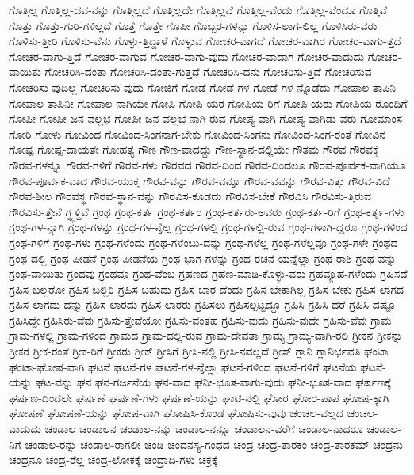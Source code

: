 {ಗೊತ್ತಿಲ್ಲ
ಗೊತ್ತಿಲ್ಲ-ದವ-ನನ್ನು
ಗೊತ್ತಿಲ್ಲದೆ
ಗೊತ್ತಿಲ್ಲದೇ
ಗೊತ್ತಿಲ್ಲವೆ
ಗೊತ್ತಿಲ್ಲ-ವೆಂದು
ಗೊತ್ತಿಲ್ಲ-ವೆಂದೂ
ಗೊತ್ತಿವೆ
ಗೊತ್ತು
ಗೊತ್ತು-ಗುರಿ-ಗಳಿಲ್ಲದೆ
ಗೊತ್ತೆ
ಗೊತ್ತೇ
ಗೊಪೀ
ಗೊಬ್ಬರ-ಗಳನ್ನು
ಗೊಳಿಸ-ಲಾಗ-ಲಿಲ್ಲ
ಗೊಳಿಸಿರು-ವರು
ಗೊಳಿಸು-ತ್ತೀರಿ
ಗೊಳಿಸು-ವೆನು
ಗೊಳ್ಳು-ತ್ತಿದ್ದಾಳೆ
ಗೊಳ್ಳುವ
ಗೋಚರ-ವಾಗದೆ
ಗೋಚರ-ವಾಗಿರ
ಗೋಚರ-ವಾಗು-ತ್ತದೆ
ಗೋಚರ-ವಾಗು-ತ್ತಿದೆ
ಗೋಚರ-ವಾಗುವ
ಗೋಚರ-ವಾಗು-ವುದು
ಗೋಚರ-ವಾದಾಗ
ಗೋಚರ-ವಾದುದು
ಗೋಚರ-ವಾಯಿತು
ಗೋಚರಿಸಿ-ದಂತಾ
ಗೋಚರಿಸಿ-ದಂತಾ-ಗುತ್ತದೆ
ಗೋಚರಿಸಿ-ದನು
ಗೋಚರಿಸು-ತ್ತಿದೆ
ಗೋಚರಿಸುವ
ಗೋಚರಿಸು-ವುದಿಲ್ಲ
ಗೋಚರಿಸು-ವುದು
ಗೋಜಿಗೆ
ಗೋಡೆ
ಗೋಡೆ-ಗಳ
ಗೋಡೆ-ಗಳ-ನ್ನೊಡೆದು
ಗೋಪಾಲ-ತಾಪಿನಿ
ಗೋಪಾಲ-ತಾಪಿನೀ
ಗೋಪಾಲ-ನಾಗಿಯೇ
ಗೋಪಿ
ಗೋಪಿ-ಯರ
ಗೋಪಿಯ-ರಿಗೆ
ಗೋಪಿ-ಯರು
ಗೋಪಿಯ-ರೊಂದಿಗೆ
ಗೋಪೀ
ಗೋಪೀ-ಜನ-ವಲ್ಲಭ
ಗೋಪೀ-ಜನ-ವಲ್ಲಭ-ನಾಗಿ-ರುವ
ಗೋಪ್ಯ-ವಾಗಿ
ಗೋಪ್ಯ-ವಾಗಿಡು-ವರು
ಗೋಮಾಂಸ
ಗೋರಿ
ಗೋಳು
ಗೋವಿಂದ
ಗೋವಿಂದ-ಸಿಂಗನಾಗ-ಬೇಕು
ಗೋವಿಂದ-ಸಿಂಗನು
ಗೋವಿಂದ-ಸಿಂಗ-ರಂತೆ
ಗೋವಿನ
ಗೋಷ್ಪ
ಗೋಷ್ಪ-ದಾಯತೇ
ಗೋಹತ್ಯೆ
ಗೌಣ
ಗೌಣ-ವಾದದ್ದು
ಗೌಣ-ಸ್ಥಾನ-ದಲ್ಲಿಯೇ
ಗೌತಮ
ಗೌರವ
ಗೌರವಕ್ಕೆ
ಗೌರವ-ಗಳನ್ನೂ
ಗೌರವ-ಗಳಿಗೆ
ಗೌರವ-ಗಳು
ಗೌರವದ
ಗೌರವ-ದಿಂದ
ಗೌರವ-ದಿಂದಲೂ
ಗೌರವ-ಪೂರ್ವಕ-ವಾಗಿಯೂ
ಗೌರವ-ಪೂರ್ವಕ-ವಾದ
ಗೌರವ-ಯುಕ್ತ
ಗೌರವ-ವನ್ನು
ಗೌರವ-ವನ್ನೂ
ಗೌರವ-ವವನ್ನು
ಗೌರವ-ವಿತ್ತು
ಗೌರವ-ವಿದೆ
ಗೌರವ-ಶೀಲ
ಗೌರವಸ್ಥ
ಗೌರವ-ಸ್ಥಾನ-ವನ್ನು
ಗೌರವಿಸ-ಕೂಡದು
ಗೌರವಿಸ-ಬೇಕೆ
ಗೌರವಿಸಿ
ಗೌರವಿಸು-ತ್ತಿರುವ
ಗೌರವಿಸು-ತ್ತೇನೆ
ಗ್ಧ್ಧಳ್ಧಿವೆ
ಗ್ರಂಥ
ಗ್ರಂಥ-ಕರ್ತ
ಗ್ರಂಥ-ಕರ್ತರ
ಗ್ರಂಥ-ಕರ್ತರು-ಅವರು
ಗ್ರಂಥ-ಕರ್ತ-ರಿಗೆ
ಗ್ರಂಥ-ಕರ್ತೃ-ಗಳು
ಗ್ರಂಥ-ಗಳ-ನ್ನಾಗಿ
ಗ್ರಂಥ-ಗಳನ್ನು
ಗ್ರಂಥ-ಗಳ-ನ್ನೆಲ್ಲ
ಗ್ರಂಥ-ಗಳಲ್ಲಿ
ಗ್ರಂಥ-ಗಳಲ್ಲಿ-ರುವ
ಗ್ರಂಥ-ಗಳಾಗಿ-ದ್ದರೂ
ಗ್ರಂಥ-ಗಳಿಂದ
ಗ್ರಂಥ-ಗಳಿಗೆ
ಗ್ರಂಥ-ಗಳು
ಗ್ರಂಥ-ಗಳೆಂದು
ಗ್ರಂಥ-ಗಳೆಂಬು-ದನ್ನು
ಗ್ರಂಥ-ಗಳೆಲ್ಲ
ಗ್ರಂಥ-ಗಳೆಲ್ಲವೂ
ಗ್ರಂಥ-ಗಳೇ
ಗ್ರಂಥದ
ಗ್ರಂಥ-ದಲ್ಲಿ
ಗ್ರಂಥ-ಪೀಡನೆ
ಗ್ರಂಥ-ಪೀಡನೆಯ
ಗ್ರಂಥ-ಭಾಗ-ಗಳನ್ನು
ಗ್ರಂಥ-ರಚನೆ-ಯನ್ನೆಲ್ಲಾ
ಗ್ರಂಥ-ರಾಶಿ
ಗ್ರಂಥ-ವನ್ನು
ಗ್ರಂಥ-ವಾಯಿತು
ಗ್ರಂಥವು
ಗ್ರಂಥವೂ
ಗ್ರಂಥ-ವೆಂಬ
ಗ್ರಹಣದ
ಗ್ರಹಣ-ಮಾಡಿ-ಕೊಳ್ಳು-ವರು
ಗ್ರಹವ್ಯೂಹ-ಗಳೆಂದು
ಗ್ರಹಿಸದೆ
ಗ್ರಹಿಸ-ಬಲ್ಲರೋ
ಗ್ರಹಿಸ-ಬಲ್ಲಿರಿ
ಗ್ರಹಿಸ-ಬಹುದು
ಗ್ರಹಿಸ-ಬಾರ-ದೆಂದು
ಗ್ರಹಿಸ-ಬೇಕಾಗಿಲ್ಲ
ಗ್ರಹಿಸ-ಬೇಕು
ಗ್ರಹಿಸ-ಲಾಗದ
ಗ್ರಹಿಸ-ಲಾಗದು-ದನ್ನು
ಗ್ರಹಿಸ-ಲಾರದು
ಗ್ರಹಿಸ-ಲಾರರು
ಗ್ರಹಿಸಲು
ಗ್ರಹಿಸಲ್ಪಟ್ಟದ್ದೂ
ಗ್ರಹಿಸಿ
ಗ್ರಹಿಸಿ-ದರೆ
ಗ್ರಹಿಸಿ-ದಷ್ಟೂ
ಗ್ರಹಿಸಿದ್ದೇ
ಗ್ರಹಿಸಿರು-ವೆವು
ಗ್ರಹಿಸು-ತ್ತೇವೆಯೋ
ಗ್ರಹಿಸು-ವಂತಹ
ಗ್ರಹಿಸು-ವುದು
ಗ್ರಹಿಸು-ವುದೇ
ಗ್ರಹಿಸು-ವೆವು
ಗ್ರಾಮ
ಗ್ರಾಮ-ಗಳಲ್ಲಿ
ಗ್ರಾಮ-ಗಳಿಂದ
ಗ್ರಾಮದ
ಗ್ರಾಮ-ದಲ್ಲಿ-ರುವ
ಗ್ರಾಮ-ದೇವತಾ
ಗ್ರಾಮ್ಯ
ಗ್ರಾಮ್ಯ-ವಾಗಿ-ರಲಿ
ಗ್ರೀಕನ
ಗ್ರೀಕನ್ನು
ಗ್ರೀಕರ
ಗ್ರೀಕ-ರಂತೆ
ಗ್ರೀಕ-ರಿಗೆ
ಗ್ರೀಕರು
ಗ್ರೀಕ್
ಗ್ರೀಸಿಗೆ
ಗ್ರೀಸಿ-ನಲ್ಲಿ
ಗ್ರೀಸಿ-ನವಲ್ಲದೆ
ಗ್ರೀಸ್
ಗ್ಲಾನಿ
ಗ್ಲಾನಿರ್ಭವತಿ
ಘಂಟಾ
ಘಂಟಾ-ಘೋಷ-ವಾಗಿ
ಘಟನೆ
ಘಟನೆ-ಗಳ
ಘಟನೆ-ಗಳ-ನ್ನೆಲ್ಲಾ
ಘಟನೆ-ಗಳಿಂದ
ಘಟನೆ-ಗಳಿಗೆ
ಘಟನೆಯ
ಘಟನೆ-ಯನ್ನು
ಘಟ-ವನ್ನು
ಘನ
ಘನ-ಗರ್ಜನೆಯ
ಘನ-ವಾದ
ಘನೀ-ಭೂತ-ವಾಗು-ವುದು
ಘನೀ-ಭೂತ-ವಾದ
ಘರ್ಷಣಕ್ಕೆ
ಘರ್ಷಣ-ದಿಂದಲೇ
ಘರ್ಷಣೆ
ಘರ್ಷಣೆ-ಗಳು
ಘರ್ಷಣೆ-ಯನ್ನು
ಘಾಟಿ-ನಲ್ಲಿ
ಘೋರ
ಘೋರ-ಪಾಪ
ಘೋಷ-ಕ್ಕಾಗಿ
ಘೋಷಣೆ
ಘೋಷಣೆ-ಯನ್ನು
ಘೋಷ-ವಾಗಿ
ಘೋಷಿಸಿ-ಕೊಂಡ
ಘೋಷಿಸು-ವುವು
ಚಂಚಲ-ವಲ್ಲದ
ಚಂಚಲ-ವಾದುದು
ಚಂಡಾಲ
ಚಂಡಾಲನ
ಚಂಡಾಲ-ನನ್ನು
ಚಂಡಾಲ-ನನ್ನೂ
ಚಂಡಾಲನ-ವರೆಗೆ
ಚಂಡಾಲ-ನಾದರೂ
ಚಂಡಾಲ-ನಿಗೆ
ಚಂಡಾಲ-ರನ್ನು
ಚಂಡಾಲ-ರಾಗಲೀ
ಚಂಡಿ
ಚಂದನಸ್ಯ-ಗಂಧದ
ಚಂದ್ರ
ಚಂದ್ರ-ತಾರಕಂ
ಚಂದ್ರ-ತಾರಕಮ್
ಚಂದ್ರನು
ಚಂದ್ರನೂ
ಚಂದ್ರ-ರೆಲ್ಲ
ಚಂದ್ರ-ಲೋಕಕ್ಕೆ
ಚಂದ್ರಾದಿ-ಗಳು
ಚಕ್ರಕ್ಕೆ
}
